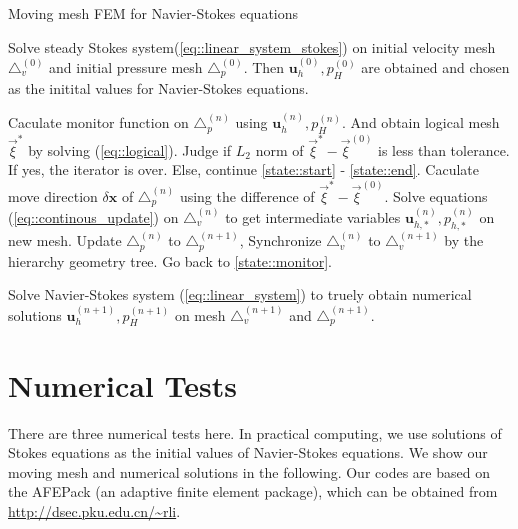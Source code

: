 \documentclass[mathpazo]{aamm}
\begin{document}
   \begin{algorithm}
     \caption{Moving mesh FEM for Navier-Stokes equations}
     \begin{algorithmic}[1]
       \State Solve steady Stokes
       system(\ref{eq::linear_system_stokes}) on initial 
       velocity mesh $\triangle_v^{(0)}$ and initial pressure mesh
       $\triangle_p^{(0)}$. Then $\mathbf{u}_h^{(0)}, p_H^{(0)}$ are
       obtained and chosen as the initital values for Navier-Stokes equations. 

             \State Caculate monitor function on $\triangle_p^{(n)}$
                    using $\mathbf{u}_h^{(n)}, p_H^{(n)}$. And obtain
                    logical mesh $\vec{\xi}^*$ by solving
                    (\ref{eq::logical}). \label{state::monitor}
             \State Judge if $L_2$ norm of $\vec{\xi}^* -
                    \vec{\xi}^{(0)}$ is less than tolerance. If yes,
                    the iterator is over. Else, continue
                    \ref{state::start} - \ref{state::end}.
             \State Caculate move direction $\delta \mathbf{x}$ of
                    $\triangle_p^{(n)}$ using the difference of
                    $\vec{\xi}^* - \vec{\xi}^{(0)}$. 
                    \label{state::start}
             \State Solve equations (\ref{eq::continous_update}) on
                    $\triangle_v^{(n)}$ to get intermediate variables 
                    $\mathbf{u}_{h, *}^{(n)}, p_{h, *}^{(n)}$ on new
                    mesh.
             \State Update $\triangle_p^{(n)}$ to $\triangle_p^{(n + 1)}$, Synchronize
                    $\triangle_v^{(n)}$ to $\triangle_v^{(n + 1)}$ by
                    the hierarchy geometry tree.
             \State Go back to \ref{state::monitor}. \label{state::end}       
             
             \State Solve Navier-Stokes system
                    (\ref{eq::linear_system}) to truely obtain numerical
                    solutions $\mathbf{u}_h^{(n + 1)}, p_H^{(n + 1)}$ on
                    mesh $\triangle_v^{(n + 1)}$ and $\triangle_p^{(n
                      + 1)}$.
      \EndWhile     
     \end{algorithmic}
     \label{alg::solve}
   \end{algorithm}
   
\section{Numerical Tests}
     \label{sec7} There are three numerical tests here. In practical computing, 
     we use solutions of Stokes equations as the initial values of
     Navier-Stokes equations.  We show our moving mesh and numerical
     solutions in the following. Our codes are based on the AFEPack
     (an adaptive finite element package), which can be obtained from
     \url{http://dsec.pku.edu.cn/~rli}.
\end{document}
